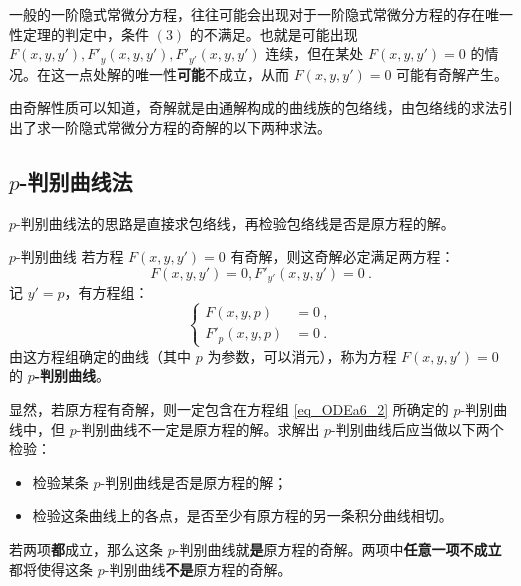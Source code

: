 
\begin{issues}
\end{issues}

一般的一阶隐式常微分方程，往往可能会出现对于一阶隐式常微分方程的存在唯一性定理的判定中，条件 $(3)$ 的不满足。也就是可能出现 $F(x,y,y'), F'_y(x,y,y'), F'_{y'}(x,y,y')$ 连续，但在某处 $F(x,y,y')=0$ 的情况。在这一点处解的唯一性\textbf{可能}不成立，从而 $F(x,y,y')=0$ 可能有奇解产生。

由奇解性质可以知道，奇解就是由通解构成的曲线族的包络线，由包络线的求法引出了求一阶隐式常微分方程的奇解的以下两种求法。
\subsection{$p$-判别曲线法}\label{sub_ODEa6_1}
$p$-判别曲线法的思路是直接求包络线，再检验包络线是否是原方程的解。
\begin{definition}{$p$-判别曲线}
若方程 $F(x,y,y')=0$ 有奇解，则这奇解必定满足两方程：
\begin{equation}\label{eq_ODEa6_1}
F(x,y,y')=0, F'_{y'}(x,y,y')=0 ~.
\end{equation}
记 $y'=p$，有方程组：
\begin{equation}\label{eq_ODEa6_2}
\left \{
\begin{aligned}
F(x,y,p) &= 0~, \\
F'_{p}(x,y,p) &= 0~.
\end{aligned}
\right .
\end{equation}
由这方程组确定的曲线（其中 $p$ 为参数，可以消元），称为方程 $F(x,y,y')=0$ 的 \textbf{$p$-判别曲线}。
\end{definition}
显然，若原方程有奇解，则一定包含在方程组 \autoref{eq_ODEa6_2} 所确定的 $p$-判别曲线中，但 $p$-判别曲线不一定是原方程的解。求解出 $p$-判别曲线后应当做以下两个检验：
\begin{itemize}
\item 检验某条 $p$-判别曲线是否是原方程的解；
\item 检验这条曲线上的各点，是否至少有原方程的另一条积分曲线相切。
\end{itemize}
若两项\textbf{都}成立，那么这条 $p$-判别曲线就\textbf{是}原方程的奇解。两项中\textbf{任意一项不成立}都将使得这条 $p$-判别曲线\textbf{不是}原方程的奇解。
